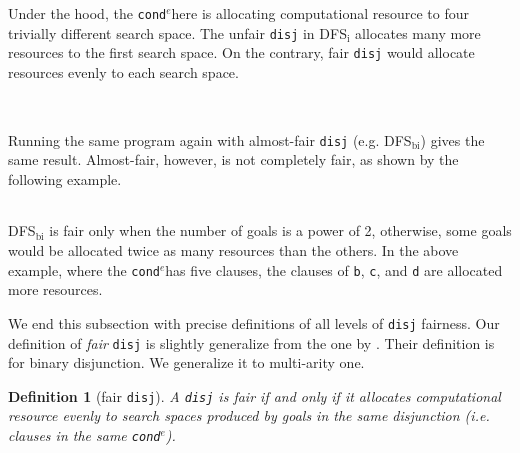 \documentclass[format=acmlarge, review=true, authordraft=true]{acmart}
\newcommand{\conde}{\texttt{cond$^e$}}
\newcommand{\disj}{\texttt{disj}}
\newcommand{\DFSi }[0]{DFS$_\textrm{i}$}
\newcommand{\DFSbi}[0]{DFS$_\textrm{bi}$}
\newtheorem{defn}{Definition}[section]
\begin{document}
\begin{center}
	\begin{tabular}{c}
		
	\end{tabular}
\end{center}

Under the hood, the \conde here is allocating computational resource to 
four trivially different search space. The unfair \disj{} in 
\DFSi{} allocates many more resources to the first search space. On the 
contrary, fair \disj{} would allocate resources evenly to each search space. 

\begin{center}
	\begin{tabular}{c}
		
	\end{tabular}
\end{center}
\begin{center}
\begin{tabular}{c}
	
\end{tabular}
\end{center}

Running the same program again with almost-fair \disj {} (e.g. 
DFS$_\textrm{bi}$) gives the same result. Almost-fair, however, is not 
completely fair, as shown by the following example. 

\begin{center}
	\begin{tabular}{c}
		
	\end{tabular}
\end{center}

\DFSbi{} is fair only when the number of goals is a power of 2, 
otherwise, some goals would be allocated twice as many resources than the 
others. In the above example, where the \conde has five clauses, the clauses of 
\texttt{b}, \texttt{c}, and \texttt{d} are allocated more resources.

We end this subsection with precise definitions of all levels of 
\disj{} fairness. Our definition of \emph{fair} \disj{} is slightly generalize 
from the one by \citet{seres1999algebra}. Their definition is for binary 
disjunction. We generalize it to multi-arity one.

\begin{defn}[fair \disj{}]
A \disj{} is fair if and only if it allocates computational resource evenly to 
search spaces produced by goals in the same disjunction (i.e. clauses in 
the same \conde).
\end{defn}
\end{document}
